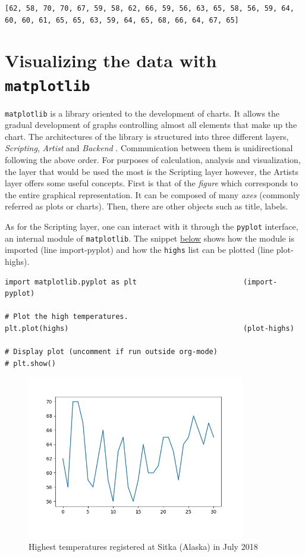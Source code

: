 \documentclass[10pt]{book}
\begin{document}
\label{orgad481af}
\begin{verbatim}
[62, 58, 70, 70, 67, 59, 58, 62, 66, 59, 56, 63, 65, 58, 56, 59, 64, 60, 60, 61, 65, 65, 63, 59, 64, 65, 68, 66, 64, 67, 65]
\end{verbatim}
\section{Visualizing the data with \texttt{matplotlib}}
\label{sec:org79e06b8}
\texttt{matplotlib} is a library oriented to the development of charts. It allows the gradual development of graphs controlling almost all elements that make up the chart. The architectures of the library is structured into three different layers, \emph{Scripting}, \emph{Artist} and \emph{Backend} \parencite{Nelli-2023}. Communication between them is unidirectional following the above order. For purposes of calculation, analysis and visualization, the layer that would be used the most is the Scripting layer however, the Artists layer offers some useful concepts. First is that of the \emph{figure} which corresponds to the entire graphical representation. It can be composed of many \emph{axes} (commonly referred as plots or charts). Then, there are other objects such as title, labels.

As for the Scripting layer, one can interact with it through the \texttt{pyplot} interface, an internal module of \texttt{matplotlib}. The snippet \hyperref[orgf51e7c2]{below} shows how the module is imported (line import-pyplot) and how the \texttt{highs} list can be plotted (line plot-highs).

\label{orgf51e7c2}
\begin{verbatim}
import matplotlib.pyplot as plt                         (import-pyplot)

# Plot the high temperatures.
plt.plot(highs)                                         (plot-highs)

# Display plot (uncomment if run outside org-mode)
# plt.show()
\end{verbatim}

\begin{figure}[!ht]
\centering
\includegraphics[width=0.85\textwidth]{output/images/High_temp1.png}
\caption{\label{fig:orge6f351c}Highest temperatures registered at Sitka (Alaska) in July 2018}
\end{figure}
\end{document}
